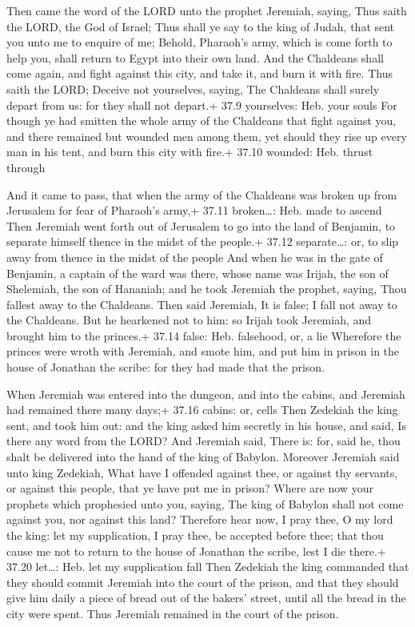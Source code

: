  Then came the word of the LORD unto the prophet Jeremiah,
saying,  Thus saith the LORD, the God of Israel; Thus shall
ye say to the king of Judah, that sent you unto me to enquire of me;
Behold, Pharaoh's army, which is come forth to help you, shall return to
Egypt into their own land.  And the Chaldeans shall come
again, and fight against this city, and take it, and burn it with fire.
 Thus saith the LORD; Deceive not yourselves, saying, The
Chaldeans shall surely depart from us: for they shall not depart.+ 37.9
yourselves: Heb. your souls  For though ye had smitten the
whole army of the Chaldeans that fight against you, and there remained
but wounded men among them, yet should they rise up every man in his
tent, and burn this city with fire.+ 37.10 wounded: Heb. thrust through

 And it came to pass, that when the army of the Chaldeans
was broken up from Jerusalem for fear of Pharaoh's army,+ 37.11
broken\ldots: Heb. made to ascend  Then Jeremiah went forth
out of Jerusalem to go into the land of Benjamin, to separate himself
thence in the midst of the people.+ 37.12 separate\ldots: or, to slip
away from thence in the midst of the people  And when he
was in the gate of Benjamin, a captain of the ward was there, whose name
was Irijah, the son of Shelemiah, the son of Hananiah; and he took
Jeremiah the prophet, saying, Thou fallest away to the Chaldeans.
 Then said Jeremiah, It is false; I fall not away to the
Chaldeans. But he hearkened not to him: so Irijah took Jeremiah, and
brought him to the princes.+ 37.14 false: Heb. falsehood, or, a lie
 Wherefore the princes were wroth with Jeremiah, and smote
him, and put him in prison in the house of Jonathan the scribe: for they
had made that the prison.

 When Jeremiah was entered into the dungeon, and into the
cabins, and Jeremiah had remained there many days;+ 37.16 cabins: or,
cells  Then Zedekiah the king sent, and took him out: and
the king asked him secretly in his house, and said, Is there any word
from the LORD? And Jeremiah said, There is: for, said he, thou shalt be
delivered into the hand of the king of Babylon.  Moreover
Jeremiah said unto king Zedekiah, What have I offended against thee, or
against thy servants, or against this people, that ye have put me in
prison?  Where are now your prophets which prophesied unto
you, saying, The king of Babylon shall not come against you, nor against
this land?  Therefore hear now, I pray thee, O my lord the
king: let my supplication, I pray thee, be accepted before thee; that
thou cause me not to return to the house of Jonathan the scribe, lest I
die there.+ 37.20 let\ldots: Heb. let my supplication fall 
Then Zedekiah the king commanded that they should commit Jeremiah into
the court of the prison, and that they should give him daily a piece of
bread out of the bakers' street, until all the bread in the city were
spent. Thus Jeremiah remained in the court of the prison.

